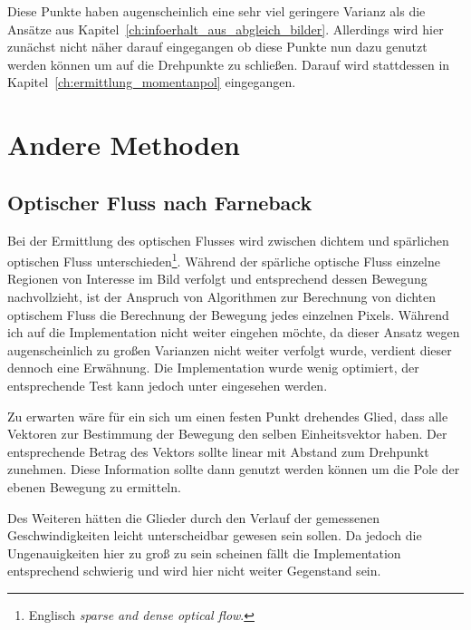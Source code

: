 Diese Punkte haben augenscheinlich eine sehr viel geringere Varianz als die Ansätze aus Kapitel~\ref{ch:infoerhalt_aus_abgleich_bilder}.
Allerdings wird hier zunächst nicht näher darauf eingegangen ob diese Punkte nun dazu genutzt werden können um auf die Drehpunkte zu schließen.
Darauf wird stattdessen in Kapitel~\ref{ch:ermittlung_momentanpol} eingegangen.

\section{Andere Methoden}

\subsection{Optischer Fluss nach Farneback}

Bei der Ermittlung des optischen Flusses wird zwischen dichtem und spärlichen optischen Fluss unterschieden\footnote{Englisch \textit{sparse and dense optical flow}.}.
Während der spärliche optische Fluss einzelne Regionen von Interesse im Bild verfolgt und entsprechend dessen Bewegung nachvollzieht, ist der Anspruch von Algorithmen zur Berechnung von dichten optischem Fluss die Berechnung der Bewegung jedes einzelnen Pixels.
Während ich auf die Implementation nicht weiter eingehen möchte, da dieser Ansatz wegen augenscheinlich zu großen Varianzen nicht weiter verfolgt wurde, verdient dieser dennoch eine Erwähnung.
Die Implementation wurde wenig optimiert, der entsprechende Test kann jedoch unter  eingesehen werden.

Zu erwarten wäre für ein sich um einen festen Punkt drehendes Glied, dass alle Vektoren zur Bestimmung der Bewegung den selben Einheitsvektor haben.
Der entsprechende Betrag des Vektors sollte linear mit Abstand zum Drehpunkt zunehmen.
Diese Information sollte dann genutzt werden können um die Pole der ebenen Bewegung zu ermitteln.

Des Weiteren hätten die Glieder durch den Verlauf der gemessenen Geschwindigkeiten leicht unterscheidbar gewesen sein sollen.
Da jedoch die Ungenauigkeiten hier zu groß zu sein scheinen fällt die Implementation entsprechend schwierig und wird hier nicht weiter Gegenstand sein.

